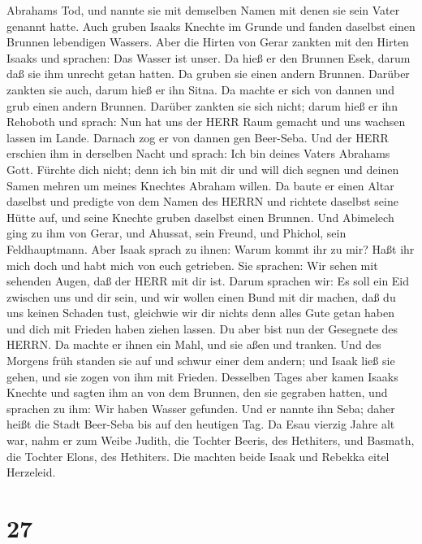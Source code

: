 Abrahams Tod, und nannte sie mit demselben Namen mit denen sie sein
Vater genannt hatte.  Auch gruben Isaaks Knechte im Grunde
und fanden daselbst einen Brunnen lebendigen Wassers.  Aber
die Hirten von Gerar zankten mit den Hirten Isaaks und sprachen: Das
Wasser ist unser. Da hieß er den Brunnen Esek, darum daß sie ihm unrecht
getan hatten.  Da gruben sie einen andern Brunnen. Darüber
zankten sie auch, darum hieß er ihn Sitna.  Da machte er
sich von dannen und grub einen andern Brunnen. Darüber zankten sie sich
nicht; darum hieß er ihn Rehoboth und sprach: Nun hat uns der HERR Raum
gemacht und uns wachsen lassen im Lande.  Darnach zog er
von dannen gen Beer-Seba.  Und der HERR erschien ihm in
derselben Nacht und sprach: Ich bin deines Vaters Abrahams Gott. Fürchte
dich nicht; denn ich bin mit dir und will dich segnen und deinen Samen
mehren um meines Knechtes Abraham willen.  Da baute er
einen Altar daselbst und predigte von dem Namen des HERRN und richtete
daselbst seine Hütte auf, und seine Knechte gruben daselbst einen
Brunnen.  Und Abimelech ging zu ihm von Gerar, und Ahussat,
sein Freund, und Phichol, sein Feldhauptmann.  Aber Isaak
sprach zu ihnen: Warum kommt ihr zu mir? Haßt ihr mich doch und habt
mich von euch getrieben.  Sie sprachen: Wir sehen mit
sehenden Augen, daß der HERR mit dir ist. Darum sprachen wir: Es soll
ein Eid zwischen uns und dir sein, und wir wollen einen Bund mit dir
machen,  daß du uns keinen Schaden tust, gleichwie wir dir
nichts denn alles Gute getan haben und dich mit Frieden haben ziehen
lassen. Du aber bist nun der Gesegnete des HERRN.  Da
machte er ihnen ein Mahl, und sie aßen und tranken.  Und
des Morgens früh standen sie auf und schwur einer dem andern; und Isaak
ließ sie gehen, und sie zogen von ihm mit Frieden. 
Desselben Tages aber kamen Isaaks Knechte und sagten ihm an von dem
Brunnen, den sie gegraben hatten, und sprachen zu ihm: Wir haben Wasser
gefunden.  Und er nannte ihn Seba; daher heißt die Stadt
Beer-Seba bis auf den heutigen Tag.  Da Esau vierzig Jahre
alt war, nahm er zum Weibe Judith, die Tochter Beeris, des Hethiters,
und Basmath, die Tochter Elons, des Hethiters.  Die machten
beide Isaak und Rebekka eitel Herzeleid.

\hypertarget{section-26}{%
\section{27}\label{section-26}}

